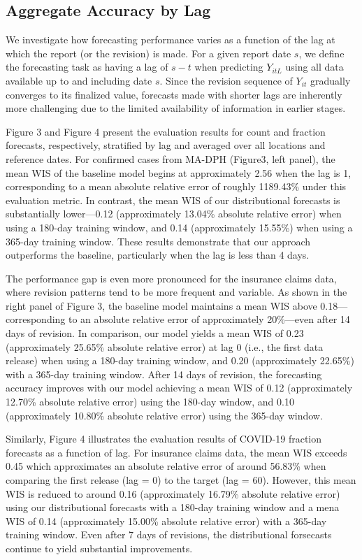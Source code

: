 \subsection{Aggregate Accuracy by Lag}
We investigate how forecasting performance varies as a function of the lag at which the report (or the revision) is made. For a given report date \( s \), we define the forecasting task as having a lag of \( s - t \) when predicting \( Y_{itL} \) using all data available up to and including date \( s \). Since the revision sequence of \( Y_{it} \) gradually converges to its finalized value, forecasts made with shorter lags are inherently more challenging due to the limited availability of information in earlier stages.

Figure 3 and Figure 4 present the evaluation results for count and fraction forecasts, respectively, stratified by lag and averaged over all locations and reference dates. For confirmed cases from MA-DPH (Figure3, left panel), the mean WIS of the baseline model begins at approximately 2.56 when the lag is 1, corresponding to a mean absolute relative error of roughly 1189.43\% under this evaluation metric. In contrast, the mean WIS of our distributional forecasts is substantially lower—0.12 (approximately 13.04\% absolute relative error) when using a 180-day training window, and 0.14 (approximately 15.55\%) when using a 365-day training window. These results demonstrate that our approach outperforms the baseline, particularly when the lag is less than 4 days.

The performance gap is even more pronounced for the insurance claims data, where revision patterns tend to be more frequent and variable. As shown in the right panel of Figure 3, the baseline model maintains a mean WIS above 0.18—corresponding to an absolute relative error of approximately 20\%—even after 14 days of revision. In comparison, our model yields a mean WIS of 0.23 (approximately 25.65\% absolute relative error) at lag 0 (i.e., the first data release) when using a 180-day training window, and 0.20 (approximately 22.65\%) with a 365-day training window. After 14 days of revision, the forecasting accuracy improves with our model achieving a mean WIS of 0.12 (approximately 12.70\% absolute relative error) using the 180-day window, and 0.10 (approximately 10.80\% absolute relative error) using the 365-day window.

Similarly, Figure 4 illustrates the evaluation results of COVID-19 fraction forecasts as a function of lag. For insurance claims data, the mean WIS exceeds 0.45 which approximates an absolute relative error of around 56.83\% when comparing the first release (lag = 0) to the target (lag = 60). However, this mean WIS is reduced to around 0.16  (approximately 16.79\% absolute relative error) using our distributional forecasts with a 180-day training window and a mena WIS of 0.14 (approximately 15.00\% absolute relative error) with a 365-day training window. Even after 7 days of revisions, the distributional forsecasts continue to yield substantial improvements. 

